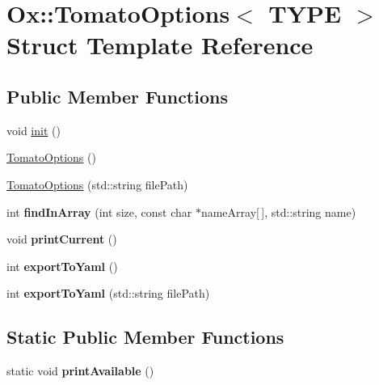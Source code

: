 \hypertarget{struct_ox_1_1_tomato_options}{\section{Ox\-:\-:Tomato\-Options$<$ T\-Y\-P\-E $>$ Struct Template Reference}
\label{struct_ox_1_1_tomato_options}
}
\subsection*{Public Member Functions}
\begin{DoxyCompactItemize}
\item 
void \hyperlink{struct_ox_1_1_tomato_options_a76497b53cadad720af7ff0f83b99096b}{init} ()
\item 
\hyperlink{struct_ox_1_1_tomato_options_a974a7659d7eaefe712b1bb00cbd46a93}{Tomato\-Options} ()
\item 
\hyperlink{struct_ox_1_1_tomato_options_abd502ef8966b09c671e2b7a5b565ce38}{Tomato\-Options} (std\-::string file\-Path)
\item 
\hypertarget{struct_ox_1_1_tomato_options_a9630620338003eb675fdfe242449c915}{int {\bfseries find\-In\-Array} (int size, const char $\ast$name\-Array\mbox{[}$\,$\mbox{]}, std\-::string name)}\label{struct_ox_1_1_tomato_options_a9630620338003eb675fdfe242449c915}

\item 
\hypertarget{struct_ox_1_1_tomato_options_ab50a9d1d7044fa64878b9b7141fd4c81}{void {\bfseries print\-Current} ()}\label{struct_ox_1_1_tomato_options_ab50a9d1d7044fa64878b9b7141fd4c81}

\item 
\hypertarget{struct_ox_1_1_tomato_options_a8c763b89efcc2122205363a7e743afa9}{int {\bfseries export\-To\-Yaml} ()}\label{struct_ox_1_1_tomato_options_a8c763b89efcc2122205363a7e743afa9}

\item 
\hypertarget{struct_ox_1_1_tomato_options_a858797a020bbb2504cfcf389bec9bca2}{int {\bfseries export\-To\-Yaml} (std\-::string file\-Path)}\label{struct_ox_1_1_tomato_options_a858797a020bbb2504cfcf389bec9bca2}

\end{DoxyCompactItemize}
\subsection*{Static Public Member Functions}
\begin{DoxyCompactItemize}
\item 
\hypertarget{struct_ox_1_1_tomato_options_ae5dba6aaf129e755d617b67d66f2d1de}{static void {\bfseries print\-Available} ()}\label{struct_ox_1_1_tomato_options_ae5dba6aaf129e755d617b67d66f2d1de}

\end{DoxyCompactItemize}
